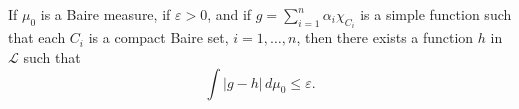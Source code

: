 If $\mu_0$ is a Baire measure, if $\varepsilon > 0$, and if $g = \sum_{i=1}^{n} \alpha_i \chi_{C_i}$ is a simple function such that each $C_i$ is a compact Baire set, $i = 1, \ldots, n$, then there exists a function $h$ in $\mathcal{L}$ such that
$$\int |g - h| \, d\mu_0 \leq \varepsilon.$$
